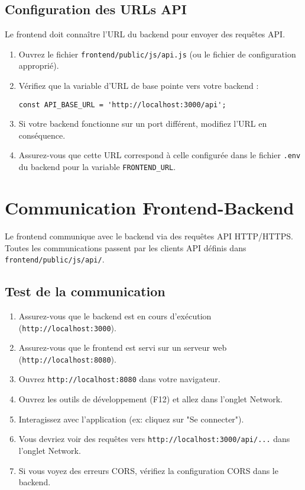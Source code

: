 \documentclass[12pt, a4paper]{article}
\begin{document}
\subsection{Configuration des URLs API}
\begin{stepbox}
Le frontend doit connaître l'URL du backend pour envoyer des requêtes API.

\begin{enumerate}
  \item Ouvrez le fichier \texttt{frontend/public/js/api.js} (ou le fichier de configuration approprié).
  \item Vérifiez que la variable d'URL de base pointe vers votre backend :
  \begin{lstlisting}
const API_BASE_URL = 'http://localhost:3000/api';
  \end{lstlisting}
  \item Si votre backend fonctionne sur un port différent, modifiez l'URL en conséquence.
  \item Assurez-vous que cette URL correspond à celle configurée dans le fichier \texttt{.env} du backend pour la variable \texttt{FRONTEND_URL}.
\end{enumerate}
\end{stepbox}

\section{Communication Frontend-Backend}
Le frontend communique avec le backend via des requêtes API HTTP/HTTPS. Toutes les communications passent par les clients API définis dans \texttt{frontend/public/js/api/}.

\subsection{Test de la communication}
\begin{stepbox}
\begin{enumerate}
  \item Assurez-vous que le backend est en cours d'exécution (\texttt{http://localhost:3000}).
  \item Assurez-vous que le frontend est servi sur un serveur web (\texttt{http://localhost:8080}).
  \item Ouvrez \texttt{http://localhost:8080} dans votre navigateur.
  \item Ouvrez les outils de développement (F12) et allez dans l'onglet Network.
  \item Interagissez avec l'application (ex: cliquez sur "Se connecter").
  \item Vous devriez voir des requêtes vers \texttt{http://localhost:3000/api/...} dans l'onglet Network.
  \item Si vous voyez des erreurs CORS, vérifiez la configuration CORS dans le backend.
\end{enumerate}
\end{stepbox}
\end{document}

